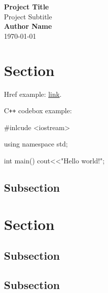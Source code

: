 \documentclass{article}
\begin{document}
\begin{titlepage}
  \centering
  \vspace*{3cm}
  \Huge
  \textbf{Project Title}\\
  \vspace{2cm}
  \huge
  Project Subtitle\\
  \vspace{2cm}
  \Large
  \textbf{Author Name}\\
  \vfill
  \Large
  \today \\
\end{titlepage}

\tableofcontents
\newpage

\section{Section}
Href example:  \href{https://github.com/sandropa}{link}.

C\verb|++| codebox example:

\begin{codebox}
#inlcude <iostream>

using namespace std;

int main()
{
  cout<<"Hello world!";
}
\end{codebox}


\subsection{Subsection}
\lipsum[5-7]

\section{Section}
\lipsum[8]

\subsection{Subsection}
\lipsum[9]

\subsection{Subsection}
\lipsum[10]
\end{document}
